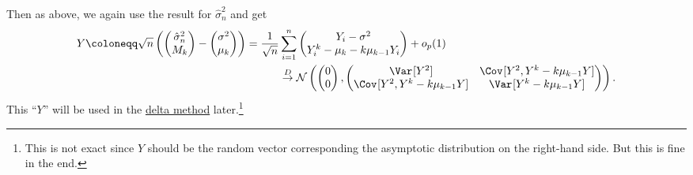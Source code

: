 Then as above, we again use the result for \(\hat{\sigma} _n^2\) and get
\[
	\begin{split}
		Y \coloneqq \sqrt{n} \left( \begin{pmatrix}
				                            \hat{\sigma} _n^2 \\
				                            M_k               \\
			                            \end{pmatrix} - \begin{pmatrix}
				                                            \sigma ^2 \\
				                                            \mu _k    \\
			                                            \end{pmatrix} \right)
		= \frac{1}{\sqrt{n} } & \sum_{i=1}^{n}  \begin{pmatrix}
			                                        Y_i - \sigma ^2                   \\
			                                        Y_i^k - \mu _k - k \mu _{k-1} Y_i \\
		                                        \end{pmatrix} + o_p(1)                                                                                                     \\
		                      & \overset{D}{\to} \mathcal{N} \left( \begin{pmatrix}
				                                                            0 \\
				                                                            0 \\
			                                                            \end{pmatrix} , \begin{pmatrix}
				                                                                            \Var_{}[Y^2]                        & \Cov_{}[Y^2 , Y^k - k \mu _{k-1} Y] \\
				                                                                            \Cov_{}[Y^2 , Y^k - k \mu _{k-1} Y] & \Var_{}[Y^k - k \mu _{k-1} Y]       \\
			                                                                            \end{pmatrix} \right).
	\end{split}
\]
This ``\(Y\)'' will be used in the \hyperref[thm:delta-method]{delta method} later.\footnote{This is not exact since \(Y\) should be the random vector corresponding the asymptotic distribution on the right-hand side. But this is fine in the end.}


